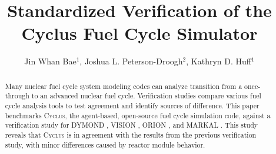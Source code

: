 \documentclass{elsarticle}
\newcommand{\Cyclus}{\textsc{Cyclus}\xspace}%
\begin{document}
\begin{frontmatter}

\title{Standardized Verification of the Cyclus Fuel Cycle Simulator}
\author{Jin Whan Bae$^{1}$, Joshua L. Peterson-Droogh$^{2}$, Kathryn D. Huff$^{1}$}
\address{$^{1}$Dept. of Nuclear, Plasma, and Radiological Engineering, University of Illinois at Urbana-Champaign, Urbana, IL \\ $^{2}$Oak Ridge National Laboratory, Oak Ridge, TN }

\begin{abstract}
Many nuclear fuel cycle system modeling codes
can analyze transition
from a once-through to an advanced nuclear
fuel cycle. Verification studies compare various
fuel cycle analysis tools to
test agreement and identify sources of difference.
This paper benchmarks \Cyclus, the agent-based,
open-source fuel cycle simulation code, against
a verification study \cite{feng_standardized_2016} for
DYMOND \cite{yacout_modeling_2005},
VISION \cite{jacobson_verifiable_2010},
ORION \cite{gregg_analysis_2012}, and
MARKAL \cite{shay_epa_2006}. This study reveals
that \Cyclus is in agreement with the results from the previous
verification study, with minor differences caused by
reactor module behavior.
\end{abstract}

\end{frontmatter}

	









\end{document}
